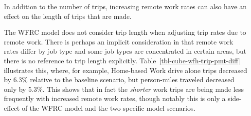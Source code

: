 \documentclass[fancy, twoside, mastersfancy, ms]{byuthesis}
\begin{document}
In addition to the number of trips, increasing remote work rates can
also have an effect on the length of trips that are made.

The WFRC model does not consider trip length when adjusting trip rates
due to remote work. There is perhaps an implicit consideration in that
remote work rates differ by job type and some job types are concentrated
in certain areas, but there is no reference to trip length explicitly.
Table~\ref{tbl-cube-wfh-trip-pmt-diff} illustrates this, where, for
example, Home-based Work drive alone trips decreased by 6.3\% relative
to the baseline scenario, but person-miles traveled decreased only by
5.3\%. This shows that in fact the \emph{shorter} work trips are being
made less frequently with increased remote work rates, though notably
this is only a side-effect of the WFRC model and the two specific model
scenarios.
\end{document}
